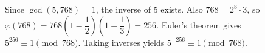 Since $\gcd(5,768)=1$, the inverse of 5 exists. Also $768=2^8\cdot3$, so $\varphi(768)=768\left(1-\dfrac{1}{2}\right)\left(1-\dfrac{1}{3}\right)=256$. Euler's theorem gives $5^{256}\equiv1\pmod{768}$. Taking inverses yields $\boxed{5^{-256}\equiv1\pmod{768}}$.
